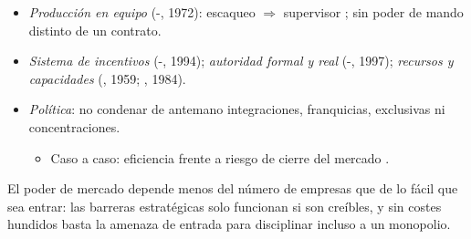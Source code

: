 \documentclass{article}
\begin{document}
\begin{columnas}
\begin{itemize}
\item \emph{Producción en equipo} (-, 1972): escaqueo $\Rightarrow$ supervisor ; sin poder de mando distinto de un contrato.
\item \emph{Sistema de incentivos} (-, 1994); \emph{autoridad formal y real} (-, 1997); \emph{recursos y capacidades} (, 1959; , 1984).
\item \emph{Política}: no condenar de antemano integraciones, franquicias, exclusivas ni concentraciones.
  \begin{itemize}
  \item Caso a caso: eficiencia frente a riesgo de cierre del mercado .
  \end{itemize}
\end{itemize}

\begin{ideaclave}
El poder de mercado depende menos del número de empresas que de lo fácil que sea entrar: las barreras estratégicas solo funcionan si son creíbles, y sin costes hundidos basta la amenaza de entrada para disciplinar incluso a un monopolio.
\end{ideaclave}


\end{columnas}
\end{document}
